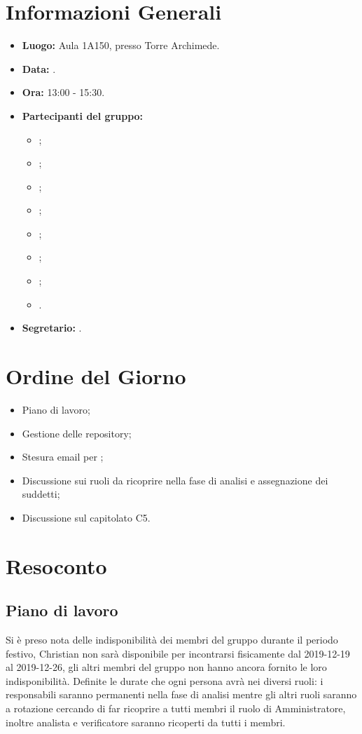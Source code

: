 \section{Informazioni Generali}
\begin{itemize}
\item \textbf{Luogo:} Aula 1A150, presso Torre Archimede.
\item \textbf{Data:} \Data.
\item \textbf{Ora:} 13:00 - 15:30.
\item \textbf{Partecipanti del gruppo:}
	\begin{itemize}
		\item \AT{}; 
		\item \BR{};
		\item \CE{}; 
		\item \DF{};
		\item \LD{};
		\item \MC{};
		\item \PF{};
		\item \SE{}.
	\end{itemize} 
\item \textbf{Segretario:} \LD{}.
\end{itemize}


\section{Ordine del Giorno}
\begin{itemize}
\item Piano di lavoro;
\item Gestione delle repository;
\item Stesura email per \Proponente{};
\item Discussione sui ruoli da ricoprire nella fase di analisi e assegnazione dei suddetti;
\item Discussione sul capitolato C5.
\end{itemize}



\section{Resoconto}
\subsection{Piano di lavoro}
Si è preso nota delle indisponibilità dei membri del gruppo durante il periodo festivo, Christian non sarà disponibile per incontrarsi fisicamente dal 2019-12-19 al 2019-12-26, gli altri membri del gruppo non hanno ancora fornito le loro indisponibilità. 
Definite le durate che ogni persona avrà nei diversi ruoli: i responsabili saranno permanenti nella fase di analisi mentre gli altri ruoli saranno a rotazione cercando di far ricoprire a tutti membri il ruolo di Amministratore, inoltre analista e verificatore saranno ricoperti da tutti i membri.  \\

